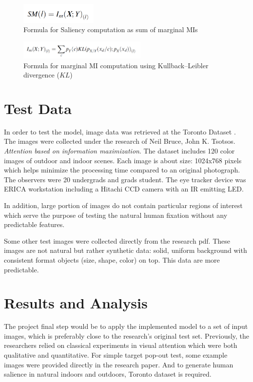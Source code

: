 \documentclass[conference]{IEEEtran}
\begin{document}
\begin{figure}[h]
    \centering
    \includegraphics[width=1.5in]{alternative.png}
    \caption{Formula for Saliency computation as sum of marginal MIs}
    \label{fig:sum_formula}
\end{figure}
 
\begin{figure}[h]
    \centering
    \includegraphics[width=2.5in]{KL.png}
    \caption{Formula for marginal MI computation using Kullback–Leibler divergence ($KL$) }
    \label{fig:kl_formula}
\end{figure}

\section{Test Data}
In order to test the model, image data was retrieved at the Toronto Dataset \cite{MITBenchmark_2012}. The images were collected under the research of Neil Bruce, John K. Tsotsos. \textit{Attention based on information maximization}. The dataset includes 120 color images of outdoor and indoor scenes. Each image is about size: 1024x768 pixels which helps minimize the processing time compared to an original photograph. The observers were 20 undergrads and grads student. The eye tracker device was ERICA workstation including a Hitachi CCD camera with an IR emitting LED.

In addition, large portion of images do not contain particular regions of interest which serve the purpose of testing the natural human fixation without any predictable features. 

Some other test images were collected directly from the research pdf. These images are not natural but rather synthetic data: solid, uniform background with consistent format objects (size, shape, color) on top. This data are more predictable.

\section{Results and Analysis}
The project final step would be to apply the implemented model to a set of input images, which is preferably close to the research’s original test set. Previously, the researchers relied on classical experiments in visual attention which were both qualitative and quantitative. For simple target pop-out test, some example images were provided directly in the research paper. And to generate human salience in natural indoors and outdoors, Toronto dataset is required.
\end{document}

